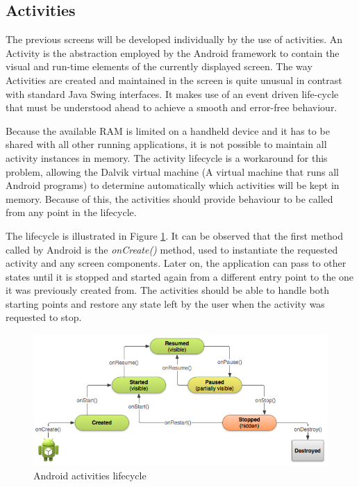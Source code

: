 \subsection{Activities}
The previous screens will be developed individually by the use of activities. An Activity is the abstraction employed by the Android framework to contain the visual and run-time elements of the currently displayed screen. The way Activities are created and maintained in the screen is quite unusual in contrast with standard Java Swing interfaces. It makes use of an event driven life-cycle that must be understood ahead to achieve a smooth and error-free behaviour. 

Because the available RAM is limited on a handheld device and it has to be shared with all other running applications, it is not possible to maintain all activity instances in memory. The activity lifecycle is a workaround for this problem, allowing the Dalvik virtual machine (A virtual machine that runs all Android programs) to determine automatically which activities will be kept in memory. Because of this, the activities should provide behaviour to be called from any point in the lifecycle.

The lifecycle is illustrated in Figure \ref{fig:activities_lifecycle}. It can be observed that the first method called by Android is the \textit{onCreate()} method, used to instantiate the requested activity and any screen components. Later on, the application can pass to other states until it is stopped and started again from a different entry point to the one it was previously created from. The activities should be able to handle both starting points and restore any state left by the user when the activity was requested to stop. 

\begin{figure}[H]
\begin{adjustbox}{width=1\textwidth,center=\textwidth}
  \centering
  \includegraphics[scale=1]{images/basic-lifecycle.png}
\end{adjustbox}
  \caption[Android activities lifecycle]{Android activities lifecycle\footnotemark}
  \label{fig:activities_lifecycle}
\end{figure}

